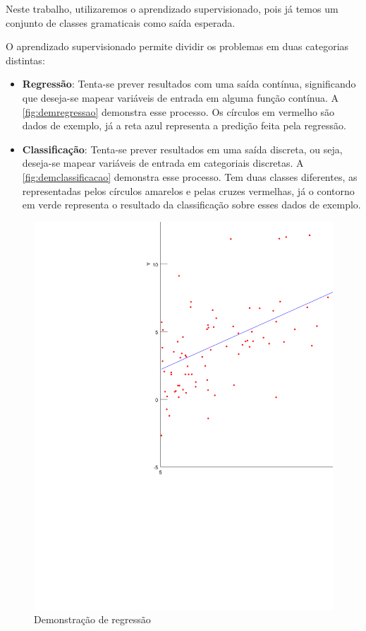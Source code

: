 Neste trabalho, utilizaremos o aprendizado supervisionado, pois já temos um conjunto de classes gramaticais como saída esperada.

O aprendizado supervisionado permite dividir os problemas em duas categorias distintas:


\begin{itemize}
	\item \textbf{Regressão}: Tenta-se prever resultados com uma saída contínua, significando que deseja-se mapear variáveis de entrada em alguma função contínua. A \autoref{fig:demregressao} demonstra esse processo. Os círculos em vermelho são dados de exemplo, já a reta azul representa a predição feita pela regressão.
	\item \textbf{Classificação}:  Tenta-se prever resultados em uma saída discreta, ou seja, deseja-se mapear variáveis de entrada em categoriais discretas. A \autoref{fig:demclassificacao} demonstra esse processo. Tem duas classes diferentes, as representadas pelos círculos amarelos e pelas cruzes vermelhas, já o contorno em verde representa o resultado da classificação sobre esses dados de exemplo.
\end{itemize}


\begin{figure}[htb]
	  \caption{Demonstração de regressão}\label{fig:demregressao}
	  \begin{center}
	      \includegraphics[scale=0.75]{img/regressao2}
	  \end{center}
\end{figure}

